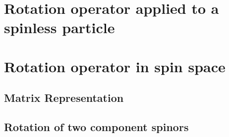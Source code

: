 \section{Rotation operator applied to a spinless particle}





\section{Rotation operator in spin space}
\subsection{Matrix Representation}

\subsection{Rotation of two component spinors}



